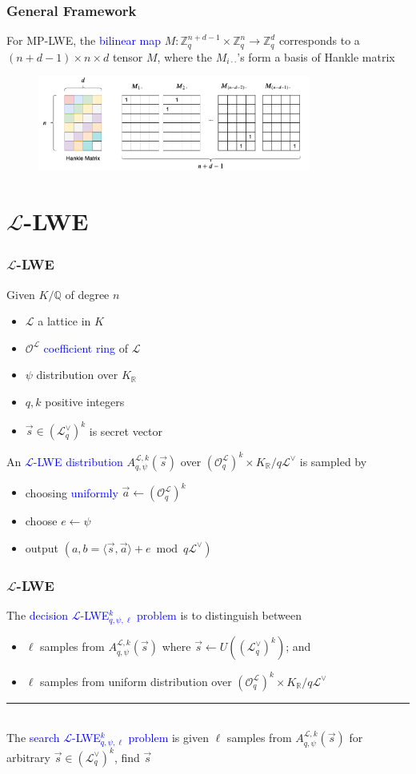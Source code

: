 \documentclass{beamer}
\newcommand{\blue}[1]{\textcolor{blue}{#1}}
\newcommand{\dgreen}[1]{\textcolor{dgreen}{#1}}
\newcommand{\cL}{\mathcal{L}}
\newcommand{\cO}{\mathcal{O}}
\newcommand{\bbQ}{\mathbb{Q}}
\newcommand{\bbR}{\mathbb{R}}
\newcommand{\bbZ}{\mathbb{Z}}
\newcommand{\cOL}{\mathcal{O}^{\mathcal{L}}}
\newcommand{\cLV}{\mathcal{L}^{\vee}}
\newcommand{\KR}{K_{\mathbb{R}}}
\newcommand{\va}{\vec{a}}
\newcommand{\vs}{\vec{s}}
\newcommand{\divline}{\noindent\rule{6cm}{0.4pt}}
\begin{document}
\frame
{
  \frametitle{General Framework}

  For MP-LWE, the \blue{bilinear map} $M:\bbZ_q^{n+d-1}\times\bbZ_q^n\to\bbZ_q^d$ corresponds to a $(n+d-1)\times n\times d$ tensor $M$, where the $M_{i\cdot\cdot}$'s form a \dgreen{basis of Hankle matrix}

  \begin{figure}[ht!]
  \includegraphics[width=0.8\textwidth]{files/Hankle-Matrix}
  \end{figure}

}

\section{$\cL$-LWE}
\frame
{
  \frametitle{$\cL$-LWE}
  Given $K/\bbQ$ of degree $n$
  \begin{itemize}
  	\item $\cL$ a lattice in $K$
  	\item $\cOL$ \blue{coefficient ring} of $\cL$
  	\item $\psi$ distribution over $K_{\bbR}$
  	\item $q,k$ positive integers
  	\item $\vs\in(\cLV_q)^k$ is secret vector
  \end{itemize}
  An \blue{$\cL$-LWE distribution} $A_{q,\psi}^{\cL,k}(\vs)$ over $(\cO_q^{\cL})^k\times\KR/q\cLV$ is sampled by
  \begin{itemize}
  	\item choosing \blue{uniformly} $\va\leftarrow(\cO_q^{\cL})^k$
  	\item choose $e\leftarrow\psi$
  	\item output $(a,b=\langle\vs,\va\rangle+e\bmod q\cLV)$
  \end{itemize}

}

\frame
{
  \frametitle{$\cL$-LWE}
  The \blue{decision $\cL$-LWE$_{q,\psi,\ell}^k$ problem} is to distinguish between
  \begin{itemize}
  	\item $\ell$ samples from \dgreen{$A_{q,\psi}^{\cL,k}(\vs)$ where $\vs\leftarrow U((\cLV_q)^k)$}; and
  	\item $\ell$ samples from \dgreen{uniform distribution over $(\cOL_q)^k\times\KR/q\cLV$}
  \end{itemize}

  \divline\\

  The \blue{search $\cL$-LWE$_{q,\psi,\ell}^k$ problem} is given $\ell$ samples from $A_{q,\psi}^{\cL,k}(\vs)$ for \dgreen{arbitrary $\vs\in (\cLV_q)^k$}, find $\vs$
}
\end{document}
